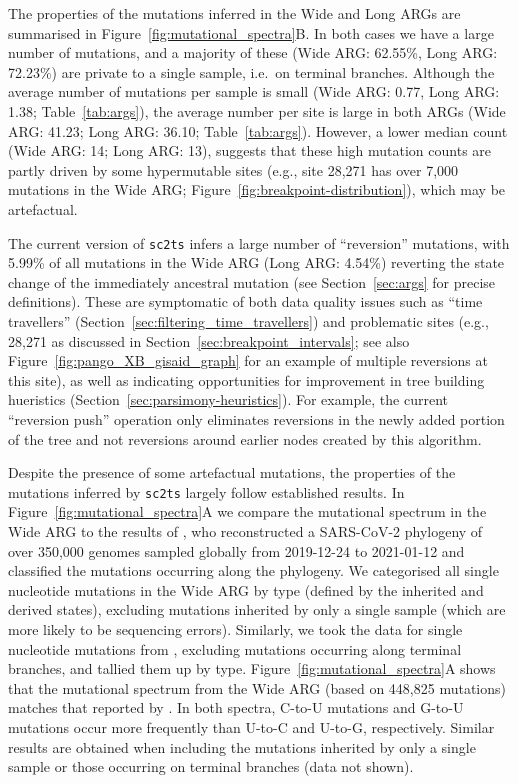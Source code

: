 \documentclass{article}
\begin{document}
The properties of the mutations inferred in the Wide and Long
ARGs are summarised in Figure~\ref{fig:mutational_spectra}B. In both
cases we have a large number of mutations, and a majority of these
(Wide ARG: 62.55\%, Long ARG: 72.23\%) are private to a single
sample, i.e.\ on terminal branches.
Although the average number
of mutations per sample is small
(Wide ARG: 0.77, Long ARG: 1.38; Table~\ref{tab:args}),
the average number per site
is large in both ARGs (Wide ARG: 41.23; Long ARG: 36.10; Table~\ref{tab:args}).
However, a lower median count (Wide ARG: 14; Long ARG: 13),
suggests that these high mutation counts are
partly driven by some hypermutable sites (e.g., site 28,271 has over 7,000
mutations in the Wide ARG; Figure~\ref{fig:breakpoint-distribution}), which
may be artefactual.

The current version of \texttt{sc2ts} infers a
large number of ``reversion'' mutations, with 5.99\% of all mutations in the Wide
ARG (Long ARG: 4.54\%) reverting the state change of the immediately
ancestral mutation (see Section~\ref{sec:args} for precise definitions).
These are symptomatic of both data quality issues
such as ``time travellers'' (Section~\ref{sec:filtering_time_travellers})
and problematic sites (e.g., 28,271 as discussed in
Section~\ref{sec:breakpoint_intervals}; see also
Figure~\ref{fig:pango_XB_gisaid_graph} for an example of multiple
reversions at this site), as well as indicating opportunities
for improvement in tree building hueristics
(Section~\ref{sec:parsimony-heuristics}).
For example, the current ``reversion push'' operation
only eliminates reversions in the newly added portion of the tree
and not reversions around earlier nodes created by this algorithm.

Despite the presence of some artefactual mutations,
the properties of the mutations inferred by \texttt{sc2ts} largely follow
established results.
In Figure~\ref{fig:mutational_spectra}A we compare the mutational spectrum
in the Wide ARG to the results of \cite{Yi2021-sc},
who reconstructed a SARS-CoV-2 phylogeny of
over 350,000 genomes sampled globally from 2019-12-24 to 2021-01-12
and classified the mutations occurring along the phylogeny.
We categorised all single nucleotide
mutations in the Wide ARG by type (defined by the inherited and derived states),
excluding mutations inherited by only a single sample (which are
more likely to be sequencing errors).
Similarly, we took the data for single nucleotide mutations from
\citet[][\url{https://github.com/ju-lab/SC2_evol_signature}]{Yi2021-sc}, excluding
mutations occurring along terminal branches, and tallied them up by type.
Figure~\ref{fig:mutational_spectra}A shows that the mutational spectrum from the
Wide ARG (based on 448,825 mutations) matches that reported by \citet[based on
92,344 mutations]{Yi2021-sc}. In both spectra, C-to-U mutations and G-to-U
mutations occur more frequently than U-to-C and U-to-G, respectively. Similar
results are obtained when including the mutations inherited by only a single
sample or those occurring on terminal branches (data not shown).
\end{document}
